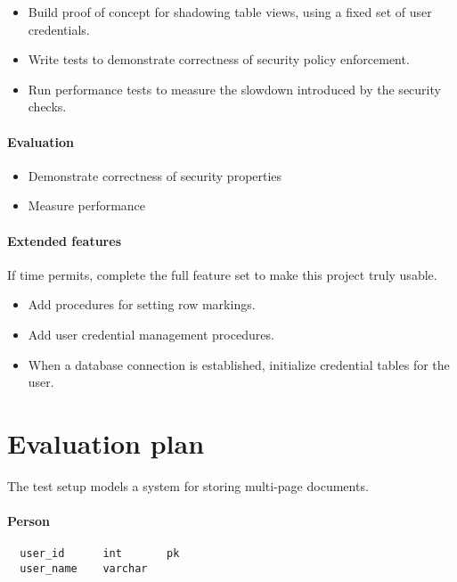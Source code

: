 \documentclass{article}
\begin{document}
\begin{itemize}
\item Build proof of concept for shadowing table views, using a fixed set of user credentials.
\item Write tests to demonstrate correctness of security policy enforcement.
\item Run performance tests to measure the slowdown introduced by the security checks.
\end{itemize}

\paragraph{Evaluation}

\begin{itemize}
\item Demonstrate correctness of security properties
\item Measure performance
\end{itemize}

\paragraph{Extended features}

If time permits, complete the full feature set to make this project truly usable.

\begin{itemize}
\item Add procedures for setting row markings.
\item Add user credential management procedures.
\item When a database connection is established, initialize credential tables for the user.
\end{itemize}

\pagebreak

\section{Evaluation plan}

The test setup models a system for storing multi-page documents.

\paragraph{Person}
\begin{verbatim}
  user_id      int       pk
  user_name    varchar
\end{verbatim}
\end{document}
